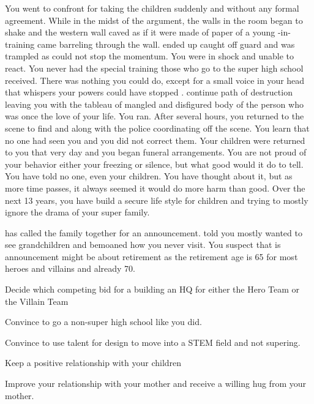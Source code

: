 \documentclass[char]{LRSguildcamp1}
\begin{document}
You went to confront \cAS{} for taking the children suddenly and without any formal agreement.  While in the midst of the argument, the walls in the room began to shake and the western wall caved as if it were made of paper of a young \cJuggernaut{\hero}-in-training \cJuggernaut{} came barreling through the wall. \cAS{} ended up caught off guard and was trampled as \cJuggernaut{} could not stop the momentum. You were in shock and unable to react. You never had the special training those who go to the super high school received. There was nothing you could do, except for a small voice in your head that whispers your powers could have stopped \cJuggernaut{}. \cJuggernaut{} continue \cJuggernaut{\their} path of destruction leaving you with the tableau of mangled and disfigured body of the person who was once the love of your life. You ran. After several hours, you returned to the scene to find \cOS{} and \cOldest{} along with the police coordinating off the scene. You learn that no one had seen you and you did not correct them. Your children were returned to you that very day and you began funeral arrangements. You are not proud of your behavior either your freezing or silence, but what good would it do to tell. You have told no one, even your children. You have thought about it, but as more time passes, it always seemed it would do more harm than good. Over the next 13 years, you have build a secure life style for children and trying to mostly ignore the drama of your super family. 

\cGrandma{} has called the family together for an announcement. \cGrandma{\They} told you mostly \cGrandma{\they} wanted to see \cGrandma{\their} grandchildren and bemoaned how you never visit.  You suspect that is announcement might be about \cGrandma{\their} retirement as the retirement age is 65 for most heroes and villains and \cGrandma{\theyare} already 70.  


\begin{itemz}[Goals]
	\item Decide which competing bid for a building an HQ for either the Hero Team or the Villain Team
	\item Convince \cTween{} to go a non-super high school like you did.  
	\item Convince \cTeen{} to use \cTeen{\their} talent for design to move into a STEM field and not supering.
	\item Keep a positive relationship with your children
	\item Improve your relationship with your mother and receive a willing hug from your mother.  
	\end{itemz}
\end{document}
